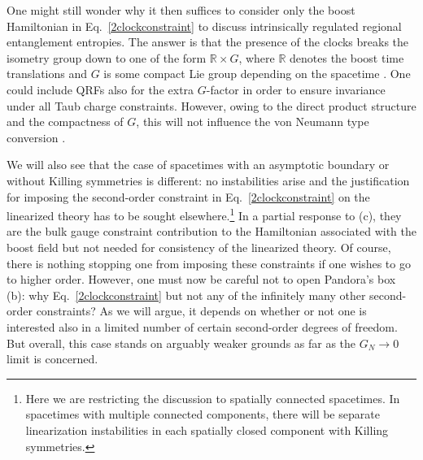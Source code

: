 \documentclass[]{jkpaper}
\theoremstyle{plain}
\theoremstyle{definition}
\begin{document}
One might still wonder why it then suffices to consider only the boost Hamiltonian in Eq.~\eqref{2clockconstraint} to discuss intrinsically regulated regional entanglement entropies. The answer is that the presence of the clocks breaks the isometry group down to one of the form $\mathbb{R}\times G$, where $\mathbb{R}$ denotes the boost time translations and $G$ is some compact Lie group depending on the spacetime \cite{Chandrasekaran:2022cip,Chen:2024rpx}. One could include QRFs also for the extra $G$-factor \cite{delaHamette:2021oex} in order to ensure invariance under all Taub charge constraints. However, owing to the direct product structure and the compactness of $G$, this will not influence the von Neumann type conversion \cite{Fewster:2024pur,AliAhmad:2024eun}.

We will also see that the case of spacetimes with an asymptotic boundary or without Killing symmetries is different:  no instabilities arise \cite{Deser:1973zzb,choquet1979maximal,fischer1980structure,Arms:1982ea} and the justification for imposing the second-order constraint in Eq.~\eqref{2clockconstraint} on the linearized theory has to be sought elsewhere.\footnote{Here we are restricting the discussion to spatially connected spacetimes. In spacetimes with multiple connected components, there will be separate linearization instabilities in each spatially closed component with Killing symmetries.} In a partial response to (c), they are the bulk gauge constraint contribution to the Hamiltonian associated with the boost field but not needed for consistency of the linearized theory. Of course, there is nothing stopping one from imposing these constraints if one wishes to go to higher order. However, one must now be careful not to open Pandora's box (b): why Eq.~\eqref{2clockconstraint} but not any of the infinitely many other second-order constraints? As we will argue, it depends on whether or not one is interested also in a limited number of certain second-order degrees of freedom. But overall, this case  stands on arguably weaker grounds as far as the $G_N\to0$ limit is concerned.
\end{document}
